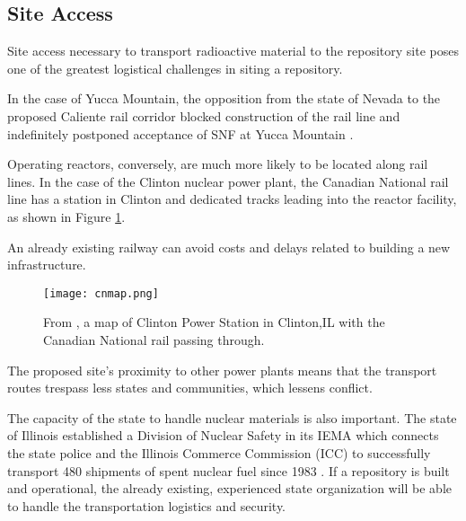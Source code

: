 	 

\subsection{Site Access}




Site access necessary to transport radioactive material to the repository site 
poses one of the greatest logistical challenges in siting a repository. 

In the case of Yucca Mountain, 
the opposition from the state of Nevada to the proposed Caliente rail corridor 
blocked construction of the rail line and indefinitely postponed
acceptance of \gls{SNF} at Yucca Mountain \cite{halstead_yucca_2011}.

Operating reactors, conversely, are much more likely to be located along rail 
lines. In the case of the Clinton nuclear power plant, 
the Canadian National rail line \cite{waleed_regional_2015} has a station in 
Clinton and dedicated tracks leading into the reactor facility, as shown in 
Figure \ref{fig:cnmap}.

An already existing railway can avoid costs and delays related to building a 
new infrastructure.

\begin{figure}[!h] 
  \centering
  \texttt{[image: cnmap.png]}	
        \caption{From \cite{canadian_national_railway_company_canadian_2016}, a map of Clinton Power Station in Clinton,IL
        with the Canadian National rail passing through.}
  \label{fig:cnmap}
\end{figure}

The proposed site's proximity to other power plants means that the transport
routes trespass less states and communities, which lessens conflict.

The capacity of the state to handle nuclear materials is also important.
The state of Illinois established a Division of Nuclear Safety in its \gls{IEMA}
which connects the state police and the Illinois Commerce Commission (ICC) to
 successfully transport 480 shipments of spent nuclear fuel since 1983
 \cite{iema_illinois_2005}. If a repository is built and operational, the already existing,
 experienced state organization will be able to handle the transportation logistics
 and security.  

